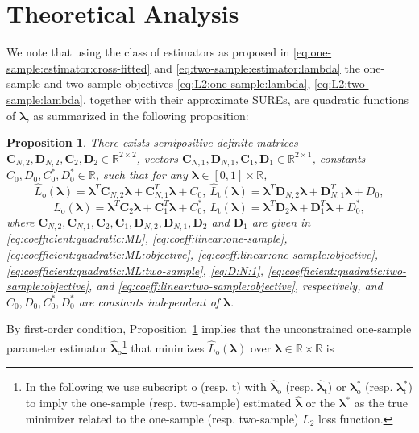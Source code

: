 \documentclass[12pt,letterpaper]{article}
\newtheorem{proposition}{Proposition}[section]
\begin{document}
\section{Theoretical Analysis}
We note that using the class of estimators as proposed in \eqref{eq:one-sample:estimator:cross-fitted} and \eqref{eq:two-sample:estimator:lambda} the one-sample and two-sample objectives \eqref{eq:L2:one-sample:lambda}, \eqref{eq:L2:two-sample:lambda}, together with their approximate SUREs, are quadratic functions of $\boldsymbol{\lambda}$, as summarized in the following proposition:
\begin{proposition}\label{prop:quadratic}
There exists semipositive definite matrices $\mathbf{C}_{N,2}, \mathbf{D}_{N,2}, \mathbf{C}_2,\mathbf{D}_2\in\mathbb{R}^{2\times 2}$, vectors $\mathbf{C}_{N,1}, \mathbf{D}_{N,1}, \mathbf{C}_1, \mathbf{D}_1\in\mathbb{R}^{2\times1}$, constants $C_0,D_0,C_0^*,D_0^*\in\mathbb{R}$, such that for any $\boldsymbol{\lambda}\in[0,1]\times\mathbb{R}$,
$$\hat{L}_{\mathrm{o}}(\boldsymbol{\lambda})=\boldsymbol{\lambda}^T\mathbf{C}_{N,2}\boldsymbol{\lambda}+\mathbf{C}_{N,1}^T\boldsymbol{\lambda}+C_0,\ \hat{L}_{\mathrm{t}}(\boldsymbol{\lambda})=\boldsymbol{\lambda}^T\mathbf{D}_{N,2}\boldsymbol{\lambda}+\mathbf{D}_{N,1}^T\boldsymbol{\lambda}+D_0,$$ 
$$L_{\mathrm{o}}(\boldsymbol{\lambda})=\boldsymbol{\lambda}^T\mathbf{C}_{2}\boldsymbol{\lambda}+\mathbf{C}_{1}^T\boldsymbol{\lambda}+C_0^*,\ L_{\mathrm{t}}(\boldsymbol{\lambda})=\boldsymbol{\lambda}^T\mathbf{D}_{2}\boldsymbol{\lambda}+\mathbf{D}_{1}^T\boldsymbol{\lambda}+D_0^*,$$ 
where $\mathbf{C}_{N,2}, \mathbf{C}_{N,1}, \mathbf{C}_2, \mathbf{C}_1, \mathbf{D}_{N,2}, \mathbf{D}_{N,1}, \mathbf{D}_2$ and $\mathbf{D}_1$ are given in \eqref{eq:coefficient:quadratic:ML}, \eqref{eq:coeff:linear:one-sample}, \eqref{eq:coefficient:quadratic:ML:objective}, \eqref{eq:coeff:linear:one-sample:objective}, \eqref{eq:coefficient:quadratic:ML:two-sample}, \eqref{eq:D:N:1}, \eqref{eq:coefficient:quadratic:two-sample:objective}, and \eqref{eq:coeff:linear:two-sample:objective}, respectively, and $C_0, D_0, C_0^*, D_0^*$ are constants independent of $\boldsymbol{\lambda}$.
\end{proposition}
By first-order condition, Proposition~\ref{prop:quadratic} implies that the unconstrained one-sample parameter estimator $\hat{\boldsymbol{\lambda}}_{\mathrm{o}}$\footnote{In the following we use subscript $\mathrm{o}$ (resp. $\mathrm{t}$) with $\hat{\boldsymbol{\lambda}}_\mathrm{o}$ (resp. $\hat{\boldsymbol{\lambda}}_\mathrm{t}$) or $\boldsymbol{\lambda}_\mathrm{o}^*$ (resp. $\boldsymbol{\lambda}_\mathrm{t}^*$) to imply the one-sample (resp. two-sample) estimated $\hat{\boldsymbol{\lambda}}$ or the $\boldsymbol{\lambda}^*$ as the true minimizer related to the one-sample (resp. two-sample) $L_2$ loss function.} that minimizes $\hat{L}_{\mathrm{o}}(\boldsymbol{\lambda})$ over $\boldsymbol{\lambda}\in\mathbb{R}\times\mathbb{R}$ is 
\end{document}
